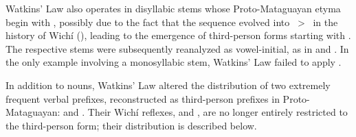 Watkins’ Law also operates in disyllabic stems whose Proto-Mataguayan etyma begin with , possibly due to the fact that the sequence  evolved into ~>~ in the history of Wichí (), leading to the emergence of third-person forms starting with . The respective stems were subsequently reanalyzed as vowel-initial, as in  and . In the only example involving a monosyllabic stem, Watkins’ Law failed to apply .

\begin{exe}
    \ex \price \label{lhx-price}
    \ex \egg \label{lhx-egg}
    \ex \headn \label{lhx-headn}
\end{exe}

In addition to nouns, Watkins’ Law altered the distribution of two extremely frequent verbal prefixes, reconstructed as third-person prefixes in Proto-Mataguayan:  and . Their Wichí reflexes,  and , are no longer entirely restricted to the third-person form; their distribution is described below.

